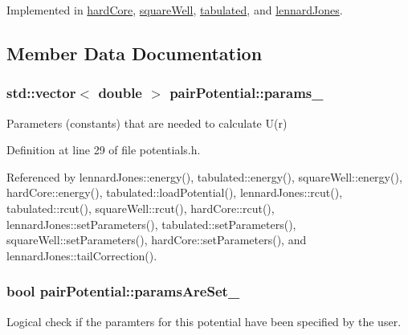 Implemented in \hyperlink{classhard_core_a90c73dbda39a9c48f1f26474474183e4}{hard\+Core}, \hyperlink{classsquare_well_a3a81297ea3a06f8a354c824a7ac5dc94}{square\+Well}, \hyperlink{classtabulated_afb2936dfc0ba4255eb06f9d81e594dd2}{tabulated}, and \hyperlink{classlennard_jones_a4518a7a9970c1fbed2f2abcf0ceebbfc}{lennard\+Jones}.



\subsection{Member Data Documentation}
\hypertarget{classpair_potential_abf8ec8af983d6e9960bd149da099e883}{}
\subsubsection[{params\+\_\+}]{\setlength{\rightskip}{0pt plus 5cm}std\+::vector$<$ double $>$ pair\+Potential\+::params\+\_\+}\label{classpair_potential_abf8ec8af983d6e9960bd149da099e883}


Parameters (constants) that are needed to calculate U(r) 



Definition at line 29 of file potentials.\+h.



Referenced by lennard\+Jones\+::energy(), tabulated\+::energy(), square\+Well\+::energy(), hard\+Core\+::energy(), tabulated\+::load\+Potential(), lennard\+Jones\+::rcut(), tabulated\+::rcut(), square\+Well\+::rcut(), hard\+Core\+::rcut(), lennard\+Jones\+::set\+Parameters(), tabulated\+::set\+Parameters(), square\+Well\+::set\+Parameters(), hard\+Core\+::set\+Parameters(), and lennard\+Jones\+::tail\+Correction().

\hypertarget{classpair_potential_a635755c0a952bfc05a4cfae230c3dbd2}{}
\subsubsection[{params\+Are\+Set\+\_\+}]{\setlength{\rightskip}{0pt plus 5cm}bool pair\+Potential\+::params\+Are\+Set\+\_\+}\label{classpair_potential_a635755c0a952bfc05a4cfae230c3dbd2}


Logical check if the paramters for this potential have been specified by the user. 



